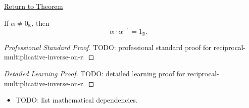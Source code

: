 \newpage
{}
\label{prf:reciprocal-multiplicative-inverse-on-r}

\begin{remark*}[Return]
\hyperref[thm:reciprocal-multiplicative-inverse-on-r]{Return to Theorem}
\end{remark*}

\begin{theorem*}
If $\alpha\ne0_{\mathbb{R}}$, then
\[
\alpha\cdot\alpha^{-1}=1_{\mathbb{R}}.
\]
\end{theorem*}

\begin{proof}[Professional Standard Proof]
\LRAProofBodyStart
TODO: professional standard proof for reciprocal-multiplicative-inverse-on-r.
\end{proof}

\begin{proof}[Detailed Learning Proof]
\LRAProofBodyStart
TODO: detailed learning proof for reciprocal-multiplicative-inverse-on-r.
\end{proof}

\begin{remark*}
\end{remark*}

\begin{dependencies}
\begin{itemize}
  \item TODO: list mathematical dependencies.
\end{itemize}
\end{dependencies}

\clearpage
